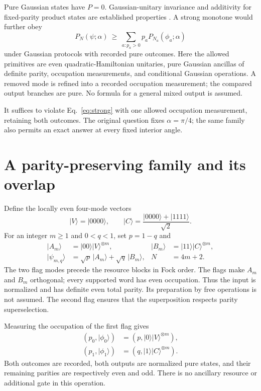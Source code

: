 \documentclass[aps,pra,reprint,amsmath,amssymb,longbibliography,floatfix]{revtex4-2}
\newcommand{\ket}[1]{\lvert #1\rangle}
\newcommand{\vac}{\ket{0000}}
\newcommand{\Ptw}{P}
\begin{document}
Pure Gaussian states have \(\Ptw=0\). Gaussian-unitary invariance
and additivity for fixed-parity product states are established
properties \cite{SunZhang2026}. A strong monotone would further obey
\begin{equation}
 \Ptw_N(\psi;\alpha)\ \geq\
       \sum_{a:p_a>0}p_a\Ptw_{N_a}(\phi_a;\alpha)
 \label{eq:strong}
\end{equation}
under Gaussian protocols with recorded pure outcomes.
Here the allowed primitives are even quadratic-Hamiltonian unitaries,
pure Gaussian ancillas of definite parity, occupation measurements,
and conditional Gaussian operations. A removed mode is refined into
a recorded occupation measurement; the compared output branches are pure.
No formula for a general mixed output is assumed.

It suffices to violate Eq.~\eqref{eq:strong} with one allowed occupation
measurement, retaining both outcomes. The original question fixes
\(\alpha=\pi/4\); the same family also permits an exact answer at
every fixed interior angle.

\section{A parity-preserving family and its overlap}
\label{sec:family}

Define the locally even four-mode vectors
\begin{equation}
 \ket V=\vac,\qquad
 \ket C=\frac{\ket{0000}+\ket{1111}}{\sqrt2}.
 \label{eq:VC}
\end{equation}
For an integer \(m\geq1\) and \(0<q<1\), set \(p=1-q\) and
\begin{align}
 \ket{A_m}&=\ket{00}\ket V^{\otimes m},&
 \ket{B_m}&=\ket{11}\ket C^{\otimes m},\label{eq:AB}\\
 \ket{\psi_{m,q}}&=\sqrt p\,\ket{A_m}
                  +\sqrt q\,\ket{B_m},&
 N&=4m+2.\label{eq:family}
\end{align}
The two flag modes precede the resource blocks in Fock order.
The flags make \(A_m\) and \(B_m\) orthogonal; every supported word
has even occupation. Thus the input is normalized and has definite
even total parity. Its preparation by free operations is not assumed.
The second flag ensures that the superposition respects parity
superselection.

Measuring the occupation of the first flag gives
\begin{align}
 (p_0,\ket{\phi_0})&=(p,\ket0\ket V^{\otimes m}),\nonumber\\
 (p_1,\ket{\phi_1})&=(q,\ket1\ket C^{\otimes m}).
 \label{eq:branches}
\end{align}
Both outcomes are recorded, both outputs are normalized pure states,
and their remaining parities are respectively even and odd.
There is no ancillary resource or additional gate in this operation.
\end{document}
